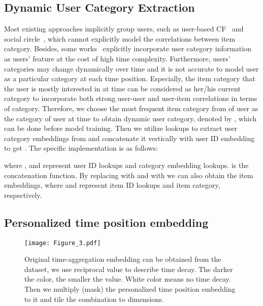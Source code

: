 \documentclass[preprint,12pt]{elsarticle}
\begin{document}
\begin{sloppypar}
\subsection{Dynamic User Category Extraction}

Most existing approaches implicitly group users, such as user-based CF~\cite{chen2020deep, koohi2016user, bellogin2012using} and social circle~\cite{purushotham2012collaborative, qian2013personalized}, which cannot explicitly model the correlations between item category. Besides, some works~\cite{papagelis2005qualitative, yang2012circle} explicitly incorporate user category information as users' feature at the cost of high time complexity. Furthermore, users' categories may change dynamically over time and it is not accurate to model user as a particular category at each time position. Especially, the item category that the user is mostly interested in at time  can be considered as her/his current category to incorporate both strong user-user and user-item correlations in terms of category. Therefore, we choose the most frequent item category from  of user  as the category of user  at time  to obtain dynamic user category, denoted by , which can be done before model training. Then we utilize lookups to extract user category embeddings from  and concatenate it vertically with user ID embedding to get . The specific implementation is as follows:

where ,  and  represent user ID lookups and category embedding lookups.  is the concatenation function. By replacing  with  and  with  we can also obtain the item embeddings, where  and  represent item ID lookups and item category, respectively.

\subsection{Personalized time position embedding}

\begin{figure}[ht]
	\centering
	\texttt{[image: Figure\_3.pdf]}
	\caption{Original time-aggregation embedding can be obtained from the dataset, we use reciprocal value to describe time decay. The darker the color, the smaller the value. White color means no time decay. Then we multiply (mask) the personalized time position embedding to it and tile the combination to  dimensions.}\label{fig:3}
\end{figure}


\end{sloppypar}
\end{document}
